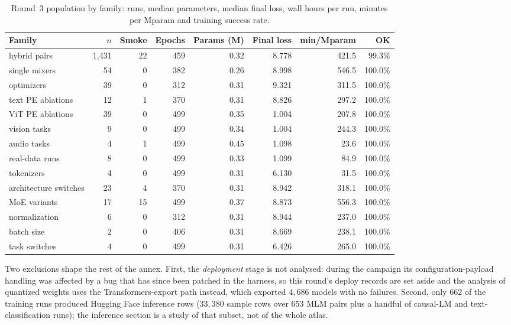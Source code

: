 \begin{table}[H]
\centering
\small
\caption{Round~3 population by family: runs, median parameters, median final loss, wall hours per run, minutes per Mparam and training success rate.}
\label{tab:r3-families}
\begin{tabular}{lrrrrrrr}
\toprule
Family & $n$ & Smoke & Epochs & Params (M) & Final loss & min/Mparam & OK \\
\midrule
hybrid pairs & 1{,}431 & 22 & 459 & 0.32 & 8.778 & 421.5 & 99.3\% \\
single mixers & 54 & 0 & 382 & 0.26 & 8.998 & 546.5 & 100.0\% \\
optimizers & 39 & 0 & 312 & 0.31 & 9.321 & 311.5 & 100.0\% \\
text PE ablations & 12 & 1 & 370 & 0.31 & 8.826 & 297.2 & 100.0\% \\
ViT PE ablations & 39 & 0 & 499 & 0.35 & 1.004 & 207.8 & 100.0\% \\
vision tasks & 9 & 0 & 499 & 0.34 & 1.004 & 244.3 & 100.0\% \\
audio tasks & 4 & 1 & 499 & 0.45 & 1.098 & 23.6 & 100.0\% \\
real-data runs & 8 & 0 & 499 & 0.33 & 1.099 & 84.9 & 100.0\% \\
tokenizers & 4 & 0 & 499 & 0.31 & 6.130 & 31.5 & 100.0\% \\
architecture switches & 23 & 4 & 370 & 0.31 & 8.942 & 318.1 & 100.0\% \\
MoE variants & 17 & 15 & 499 & 0.37 & 8.873 & 556.3 & 100.0\% \\
normalization & 6 & 0 & 312 & 0.31 & 8.944 & 237.0 & 100.0\% \\
batch size & 2 & 0 & 406 & 0.31 & 8.669 & 238.1 & 100.0\% \\
task switches & 4 & 0 & 499 & 0.31 & 6.426 & 265.0 & 100.0\% \\
\bottomrule
\end{tabular}
\end{table}

Two exclusions shape the rest of the annex. First, the \emph{deployment} stage is not analysed: during the campaign its configuration-payload handling was affected by a bug that has since been patched in the harness, so this round's deploy records are set aside and the analysis of quantized weights uses the Transformers-export path instead, which exported $4{,}686$ models with no failures. Second, only $662$ of the training runs produced Hugging Face inference rows ($33{,}380$ sample rows over $653$ MLM pairs plus a handful of causal-LM and text-classification runs); the inference section is a study of that subset, not of the whole atlas.

